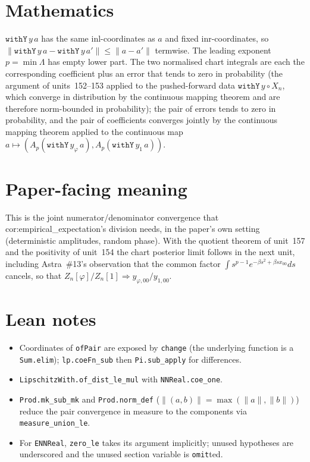 \documentclass[11pt]{article}
\begin{document}
\section{Mathematics}
$\texttt{withY}\,y\,a$ has the same $\mathrm{inl}$-coordinates as $a$ and fixed
$\mathrm{inr}$-coordinates, so $\|\texttt{withY}\,y\,a-\texttt{withY}\,y\,a'\|\le\|a-a'\|$ termwise.
The leading exponent $p=\min\Lambda$ has empty lower part. The two normalised chart integrals are
each the corresponding coefficient plus an error that tends to zero in probability (the argument of
units~152--153 applied to the pushed-forward data $\texttt{withY}\,y\circ X_n$, which converge in
distribution by the continuous mapping theorem and are therefore norm-bounded in probability); the
pair of errors tends to zero in probability, and the pair of coefficients converges jointly by the
continuous mapping theorem applied to the continuous map
$a\mapsto(A_p(\texttt{withY}\,y_\varphi\,a),A_p(\texttt{withY}\,y_1\,a))$.

\section{Paper-facing meaning}
This is the joint numerator/denominator convergence that cor:empirical\_expectation's division
needs, in the paper's own setting (deterministic amplitudes, random phase). With the quotient
theorem of unit~157 and the positivity of unit~154 the chart posterior limit follows in the next
unit, including Astra~\#13's observation that the common factor $\int s^{p-1}e^{-\beta s^2+\beta sx_{00}}ds$
cancels, so that $Z_n[\varphi]/Z_n[1]\Rightarrow y_{\varphi,00}/y_{1,00}$.

\section{Lean notes}
\begin{itemize}
\item Coordinates of \texttt{ofPair} are exposed by \texttt{change} (the underlying function is a
\texttt{Sum.elim}); \texttt{lp.coeFn\_sub} then \texttt{Pi.sub\_apply} for differences.
\item \texttt{LipschitzWith.of\_dist\_le\_mul} with \texttt{NNReal.coe\_one}.
\item \texttt{Prod.mk\_sub\_mk} and \texttt{Prod.norm\_def} ($\|(a,b)\|=\max(\|a\|,\|b\|)$) reduce the
pair convergence in measure to the components via \texttt{measure\_union\_le}.
\item For \texttt{ENNReal}, \texttt{zero\_le} takes its argument implicitly; unused hypotheses are
underscored and the unused section variable is \texttt{omit}ted.
\end{itemize}
\end{document}
